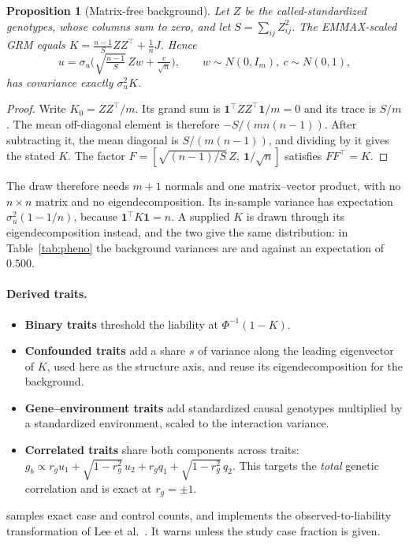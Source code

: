 \documentclass[11pt,a4paper]{article}
\newtheorem{proposition}{Proposition}
\begin{document}
\begin{proposition}[Matrix-free background]
Let $Z$ be the called-standardized genotypes, whose columns sum to zero,
and let $S=\sum_{ij}Z_{ij}^2$. The EMMAX-scaled GRM equals
$K=\frac{n-1}{S}ZZ^\top+\frac1nJ$. Hence
\[
u=\sigma_u\Big(\sqrt{\tfrac{n-1}{S}}\,Zw+\tfrac{c}{\sqrt n}\Big),
\qquad w\sim N(0,I_m),\ c\sim N(0,1),
\]
has covariance exactly $\sigma_u^2K$.
\end{proposition}
\begin{proof}
Write $K_0=ZZ^\top/m$. Its grand sum is $\mathbf1^\top Z Z^\top\mathbf1/m=0$
and its trace is $S/m$. The mean off-diagonal element is therefore
$-S/(mn(n-1))$. After subtracting it, the mean diagonal is $S/(m(n-1))$,
and dividing by it gives the stated $K$. The factor
$F=[\sqrt{(n-1)/S}\,Z,\ \mathbf1/\sqrt n]$ satisfies $FF^\top=K$.
\end{proof}
The draw therefore needs $m+1$ normals and one matrix--vector product,
with no $n\times n$ matrix and no eigendecomposition. Its in-sample
variance has expectation $\sigma_u^2(1-1/n)$, because $\mathbf1^\top
K\mathbf1=n$. A supplied $K$ is drawn through its eigendecomposition
instead, and the two give the same distribution: in
Table~\ref{tab:pheno} the background variances are \PhBgFree{} and
\PhBgDense{} against an expectation of $0.500$.

\paragraph{Derived traits.}
\begin{itemize}
\item \textbf{Binary traits} threshold the liability at
  $\Phi^{-1}(1-K)$.
\item \textbf{Confounded traits} add a share $s$ of variance along the
  leading eigenvector of $K$, used here as the structure axis, and reuse
  its eigendecomposition for the background.
\item \textbf{Gene--environment traits} add standardized causal genotypes
  multiplied by a standardized environment, scaled to the interaction
  variance.
\item \textbf{Correlated traits} share both components across traits:
  $g_b\propto r_gu_1+\sqrt{1-r_g^2}\,u_2+r_gq_1+\sqrt{1-r_g^2}\,q_2$.
  This targets the \emph{total} genetic correlation and is exact at
  $r_g=\pm1$.
\end{itemize}
 samples exact case and control counts, and
 implements the observed-to-liability transformation
of Lee et al.~\cite{lee2011}. It warns unless the study case fraction is
given.
\end{document}
